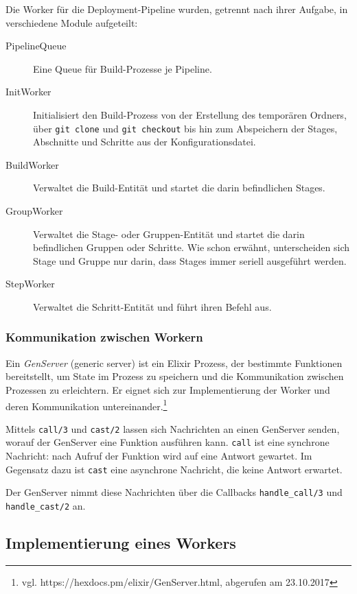 Die Worker für die Deployment-Pipeline wurden, getrennt nach ihrer Aufgabe, in verschiedene Module aufgeteilt:

\begin{description}
  \item [PipelineQueue] Eine Queue für Build-Prozesse je Pipeline.
  \item [InitWorker] Initialisiert den Build-Prozess von der Erstellung des temporären Ordners, über \texttt{git clone} und \texttt{git checkout} bis hin zum Abspeichern der Stages, Abschnitte und Schritte aus der Konfigurationsdatei.
  \item [BuildWorker] Verwaltet die Build-Entität und startet die darin befindlichen Stages.
  \item [GroupWorker] Verwaltet die Stage- oder Gruppen-Entität und startet die darin befindlichen Gruppen oder Schritte. Wie schon erwähnt, unterscheiden sich Stage und Gruppe nur darin, dass Stages immer seriell ausgeführt werden.
  \item [StepWorker] Verwaltet die Schritt-Entität und führt ihren Befehl aus.
\end{description}

\subsubsection{Kommunikation zwischen Workern}

Ein \emph{GenServer} (generic server) ist ein Elixir Prozess, der bestimmte Funktionen bereitstellt, um State im Prozess zu speichern und die Kommunikation zwischen Prozessen zu erleichtern. Er eignet sich zur Implementierung der Worker und deren Kommunikation untereinander.\footnote{vgl. https://hexdocs.pm/elixir/GenServer.html, abgerufen am 23.10.2017}

Mittels \texttt{call/3} und \texttt{cast/2} lassen sich Nachrichten an einen GenServer senden, worauf der GenServer eine Funktion ausführen kann. \texttt{call} ist eine synchrone Nachricht: nach Aufruf der Funktion wird auf eine Antwort gewartet. Im Gegensatz dazu ist \texttt{cast} eine asynchrone Nachricht, die keine Antwort erwartet.

Der GenServer nimmt diese Nachrichten über die Callbacks \texttt{handle\_\allowbreak call/3} und \texttt{handle\_\allowbreak cast/2} an.

\subsection{Implementierung eines Workers}
\label{subsec:implementierung-worker}

